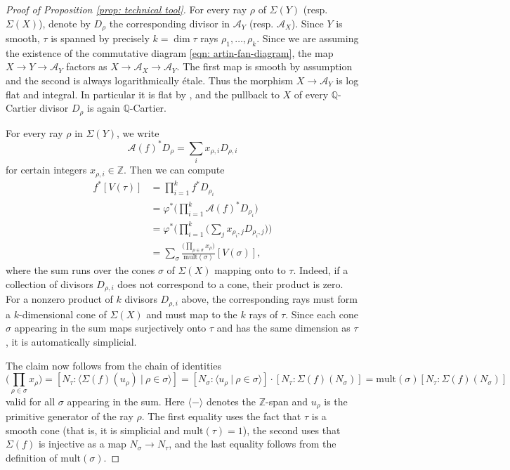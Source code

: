 \documentclass{article}
\def\Z{\mathbb{Z}}
\begin{document}
\begin{proof}[Proof of Proposition \ref{prop: technical tool}]

For every ray $\rho$ of $\Sigma(Y)$ (resp. $\Sigma(X)$), denote by $D_\rho$ 
the corresponding divisor in $\mathcal{A}_Y$ (resp. $\mathcal{A}_X$).
 Since $Y$ is smooth, $\tau$ is spanned by precisely $k=\dim \tau$ rays $\rho_1,\ldots,\rho_k$. Since we are assuming the existence of the commutative diagram \eqref{eqn: artin-fan-diagram}, the map $X \to Y \to \mathcal{A}_Y$ factors as
$
X \longrightarrow \mathcal{A}_X \longrightarrow \mathcal{A}_Y.
$
The first map is smooth by assumption and the second is always logarithmically étale. Thus the morphism $X \to \mathcal{A}_Y$ is log flat and integral. In particular it is flat by \cite[Proposition~2.3]{Mirror-GS}, and the pullback to $X$ of every $\mathbb{Q}$-Cartier divisor $D_\rho$ is again $\mathbb{Q}$-Cartier.

For every ray $\rho$ in $\Sigma(Y)$, we write
\[
\mathcal{A}(f)^* D_{\rho}= \sum_i x_{\rho,i} D_{\rho,i}
\]
for certain integers $x_{\rho,i} \in \mathbb{Z}$. Then we can compute
\begin{align*}
f^* [V(\tau)] 
&= \prod_{i=1}^k f^*D_{\rho_i} \\ 
&= \varphi^* \bigg( \prod_{i=1}^k  \mathcal{A}(f)^*D_{\rho_i} \bigg) \\
&= \varphi^* \bigg( \prod_{i=1}^k \Big(\sum_j x_{\rho_i,j}D_{\rho_i,j}\Big)\bigg)\\
&= \sum_{\sigma} \frac{\Big(\prod_{\rho \in \sigma} x_\rho\Big)}{\mathrm{mult}(\sigma)} [V(\sigma)],
\end{align*}
where the sum runs over the cones $\sigma$ of $\Sigma(X)$ mapping onto to $\tau$. Indeed, if a collection of divisors $D_{\rho,i}$ does not correspond to a cone, their product is zero. For a nonzero product of $k$ divisors $D_{\rho,i}$ above, the corresponding rays must form a $k$-dimensional cone of $\Sigma(X)$ and must map to the $k$ rays of $\tau$. Since each cone $\sigma$ appearing in the sum maps surjectively onto $\tau$ and has the same dimension as $\tau$, it is automatically simplicial.

The claim now follows from the chain of identities
\[
\Big(\prod_{\rho \in \sigma} x_\rho\Big)
= [  N_\tau: \langle \Sigma(f)(u_\rho) \ | \ \rho \in \sigma \rangle]
= [ N_\sigma: \langle u_\rho \ | \ \rho \in \sigma \rangle ] \cdot [ N_\tau: \Sigma(f)(N_\sigma)]
=  \mathrm{mult}(\sigma) [ N_\tau: \Sigma(f)(N_\sigma)]
\]
valid for all $\sigma$ appearing in the sum.  Here $\langle - \rangle$ denotes the $\Z$-span and $u_\rho$ is the primitive generator of the ray $\rho$. The first equality uses the fact that $\tau$ is a smooth cone (that is, it is simplicial and $\mathrm{mult}(\tau)=1$), the second uses that 
$\Sigma(f)$ is injective as a map $N_\sigma \to N_\tau$, and the last equality 
follows from the definition of $\mathrm{mult}(\sigma)$.
\end{proof}
\end{document}
